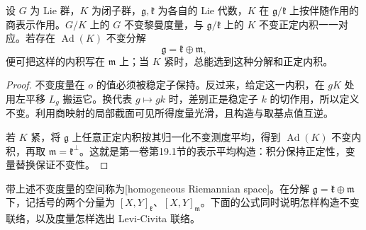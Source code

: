 \begin{proposition}\label{g3:prop:homogeneous-metric-isotropy}
	设 \(G\) 为 Lie 群，\(K\) 为闭子群，\(\mathfrak g,\mathfrak k\) 为各自的 Lie 代数，\(K\) 在 \(\mathfrak g/\mathfrak k\) 上按伴随作用的商表示作用。\(G/K\) 上的 \(G\) 不变黎曼度量，与 \(\mathfrak g/\mathfrak k\) 上的 \(K\) 不变正定内积一一对应。若存在 \(\operatorname{Ad}(K)\) 不变分解
	\[
		\mathfrak g=\mathfrak k\oplus\mathfrak m,
	\]
	便可把这样的内积写在 \(\mathfrak m\) 上；当 \(K\) 紧时，总能选到这种分解和正定内积。
\end{proposition}
\begin{proof}
	不变度量在 \(o\) 的值必须被稳定子保持。反过来，给定这一内积，在 \(gK\) 处用左平移 \(L_g\) 搬运它。换代表 \(g\mapsto gk\) 时，差别正是稳定子 \(k\) 的切作用，所以定义不变。利用商映射的局部截面可见所得度量光滑，且构造与取基点值互逆。

	若 \(K\) 紧，将 \(\mathfrak g\) 上任意正定内积按其归一化不变测度平均，得到 \(\operatorname{Ad}(K)\) 不变内积，再取 \(\mathfrak m=\mathfrak k^\perp\)。这就是第一卷第19.1节的表示平均构造：积分保持正定性，变量替换保证不变性。
\end{proof}

带上述不变度量的空间称为[homogeneous Riemannian space]。在分解 \(\mathfrak g=\mathfrak k\oplus\mathfrak m\) 下，记括号的两个分量为 \([X,Y]_{\mathfrak k}\)、\([X,Y]_{\mathfrak m}\)。下面的公式同时说明怎样构造不变联络，以及度量怎样选出 Levi-Civita 联络。

